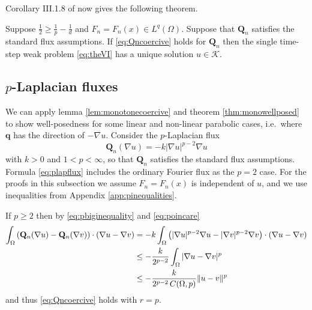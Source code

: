 \documentclass[final,leqno,onefignum,onetabnum]{siamltex1213bueler}
\newcommand\bq{\mathbf{q}}
\newcommand\bQ{\mathbf{Q}}
\renewcommand{\grad}{\nabla}
\begin{document}
Corollary III.1.8 of \cite{KinderlehrerStampacchia1980} now gives the following theorem.

\begin{theorem}  \label{thm:monowellposed}  Suppose $\frac{1}{2} \ge \frac{1}{p} - \frac{1}{d}$ and $F_n=F_n(x)\in L^q(\Omega)$.  Suppose that $\bQ_n$ satisfies the standard flux assumptions.  If \eqref{eq:Qncoercive} holds for $\bQ_n$ then the single time-step weak problem \eqref{eq:theVI} has a unique solution $u\in\mathcal{K}$.
\end{theorem}

\subsection{$p$-Laplacian fluxes} \label{subsec:plap}  We can apply lemma \ref{lem:monotonecoercive} and theorem \ref{thm:monowellposed} to show well-posedness for some linear and non-linear parabolic cases, i.e.~where $\bq$ has the direction of $-\grad u$.  Consider the $p$-Laplacian \cite{Evans1998} flux
\begin{equation}
  \bQ_n(\grad u) = - k |\grad u|^{p-2} \grad u \label{eq:plapflux}
\end{equation}
with $k>0$ and $1<p<\infty$, so that $\bQ_n$ satisfies the standard flux assumptions.  Formula \eqref{eq:plapflux} includes the ordinary Fourier flux as the $p=2$ case.  For the proofs in this subsection we assume $F_n=F_n(x)$ is independent of $u$, and we use inequalities from Appendix \ref{app:pinequalities}.

If $p\ge 2$ then by \eqref{eq:pbiginequality} and \eqref{eq:poincare}
\begin{align}
\int_\Omega \left(\bQ_n(\grad u) - \bQ_n(\grad v)\right)\cdot (\grad u - \grad v) &= -k  \int_\Omega \left(|\grad u|^{p-2} \grad u - |\grad v|^{p-2} \grad v\right)\cdot (\grad u - \grad v) \notag \\
  &\le - \frac{k}{2^{p-2}} \int_\Omega |\grad u - \grad v|^p \notag \\
  &\le - \frac{k}{2^{p-2}\,C(\Omega,p)} \|u-v\|^p \label{eq:plapQnmono}
\end{align}
and thus \eqref{eq:Qncoercive} holds with $r=p$.
\end{document}

